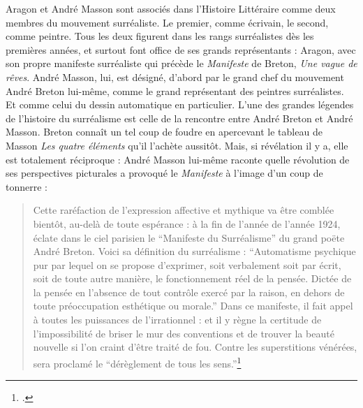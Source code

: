 Aragon et André Masson sont associés dans l’Histoire Littéraire comme deux membres du mouvement surréaliste. Le premier, comme écrivain, le second, comme peintre. Tous les deux figurent dans les rangs surréalistes dès les premières années, et surtout font office de ses grands représentants : Aragon, avec son propre manifeste surréaliste qui précède le \emph{Manifeste} de Breton, \emph{Une vague de rêves}. André Masson, lui, est désigné, d’abord par le grand chef du mouvement André Breton lui-même, comme le grand représentant des peintres surréalistes. Et comme celui du dessin automatique en particulier. L’une des grandes légendes de l’histoire du surréalisme est celle de la rencontre entre André Breton et André Masson. Breton connaît un tel coup de foudre en apercevant le tableau de Masson \emph{Les quatre éléments }qu’il l’achète aussitôt. Mais, si révélation il y a, elle est totalement réciproque : André Masson lui-même raconte quelle révolution de ses perspectives picturales a provoqué le \emph{Manifeste} à l’image d’un coup de tonnerre : 

\begin{quote}Cette raréfaction de l’expression affective et mythique va être comblée bientôt, au-delà de toute espérance : à la fin de l’année de l’année 1924, éclate dans le ciel parisien le \enquote{Manifeste du Surréalisme} du grand poëte André Breton. Voici sa définition du surréalisme : \enquote{Automatisme psychique pur par lequel on se propose d’exprimer, soit verbalement soit par écrit, soit de toute autre manière, le fonctionnement réel de la pensée. Dictée de la pensée en l’absence de tout contrôle exercé par la raison, en dehors de toute préoccupation esthétique ou morale.} Dans ce manifeste, il fait appel à toutes les puissances de l’irrationnel : et il y règne la certitude de l’impossibilité de briser le mur des conventions et de trouver la beauté nouvelle si l’on craint d’être traité de fou. Contre les superstitions vénérées, sera proclamé le \enquote{dérèglement de tous les sens.}\footcite[p21]{rebelle}\end{quote}	
		
